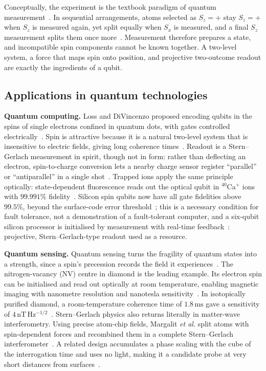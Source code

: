 Conceptually, the experiment is the textbook paradigm of quantum measurement~\cite{sakurai2020}. In sequential arrangements, atoms selected as $S_z=+$ stay $S_z=+$ when $S_z$ is measured again, yet split equally when $S_x$ is measured, and a final $S_z$ measurement splits them once more~\cite{lecture6,sakurai2020}. Measurement therefore prepares a state, and incompatible spin components cannot be known together. A two-level system, a force that maps spin onto position, and projective two-outcome readout are exactly the ingredients of a qubit.

\subsection{Applications in quantum technologies}

\textbf{Quantum computing.} Loss and DiVincenzo proposed encoding qubits in the spins of single electrons confined in quantum dots, with gates controlled electrically~\cite{loss1998}. Spin is attractive because it is a natural two-level system that is insensitive to electric fields, giving long coherence times~\cite{burkard2023}. Readout is a Stern--Gerlach measurement in spirit, though not in form: rather than deflecting an electron, spin-to-charge conversion lets a nearby charge sensor register ``parallel'' or ``antiparallel'' in a single shot~\cite{elzerman2004}. Trapped ions apply the same principle optically: state-dependent fluorescence reads out the optical qubit in $^{40}$Ca$^+$ ions with $99.991\%$ fidelity~\cite{myerson2008}. Silicon spin qubits now have all gate fidelities above $99.5\%$, beyond the surface-code error threshold~\cite{xue2022}; this is a necessary condition for fault tolerance, not a demonstration of a fault-tolerant computer, and a six-qubit silicon processor is initialised by measurement with real-time feedback~\cite{philips2022}: projective, Stern--Gerlach-type readout used as a resource.

\textbf{Quantum sensing.} Quantum sensing turns the fragility of quantum states into a strength, since a spin's precession records the field it experiences~\cite{degen2017}. The nitrogen-vacancy (NV) centre in diamond is the leading example. Its electron spin can be initialised and read out optically at room temperature, enabling magnetic imaging with nanometre resolution and nanotesla sensitivity~\cite{rondin2014}. In isotopically purified diamond, a room-temperature coherence time of $1.8\,\mathrm{ms}$ gave a sensitivity of $4\,\mathrm{nT\,Hz^{-1/2}}$~\cite{balasubramanian2009}. Stern--Gerlach physics also returns literally in matter-wave interferometry. Using precise atom-chip fields, Margalit \emph{et al.} split atoms with spin-dependent forces and recombined them in a complete Stern--Gerlach interferometer~\cite{margalit2021}. A related design accumulates a phase scaling with the cube of the interrogation time and uses no light, making it a candidate probe at very short distances from surfaces~\cite{amit2019}.

